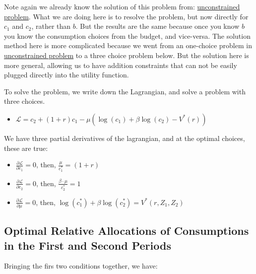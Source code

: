 \documentclass[
]{book}
\providecommand{\tightlist}{%
  \setlength{\itemsep}{0pt}\setlength{\parskip}{0pt}}
\begin{document}
Note again we already know the solution of this problem from:
\href{https://fanwangecon.github.io/Math4Econ/derivative_application/K_save_households.html}{unconstrained
problem}.
What we are doing here is to resolve the problem, but now directly for
\(c_1\) and \(c_2\), rather than \(b\). But the results are the same because
once you know \(b\) you know the consumption choices from the budget, and
vice-versa. The solution method here is more complicated because we went
from an one-choice problem in \href{https://fanwangecon.github.io/Math4Econ/derivative_application/K_save_households.html}{unconstrained
problem}
to a three choice problem below. But the solution here is more general,
allowing us to have addition constraints that can not be easily plugged
directly into the utility function.

To solve the problem, we write down the Lagrangian, and solve a problem
with three choices.

\begin{itemize}
\tightlist
\item
  \(\displaystyle \mathcal{L}=c_2 +(1+r)c_1 -\mu \left(\log (c_1 )+\beta \log (c_2 )-V^* (r)\right)\)
\end{itemize}

We have three partial derivatives of the lagrangian, and at the optimal
choices, these are true:

\begin{itemize}
\item
  \(\frac{\partial \mathcal{L}}{\partial c_1 }=0\), then,
  \(\frac{\mu }{c_1^{\ast } }=(1+r)\)
\item
  \(\frac{\partial \mathcal{L}}{\partial c_2 }=0\), then,
  \(\frac{\beta \cdot \mu }{c_2^{\ast } }=1\)
\item
  \(\frac{\partial \mathcal{L}}{\partial \mu }=0\), then,
  \(\log (c_1^{\ast } )+\beta \log (c_2^{\ast } )=V^{\ast } (r,Z_1 ,Z_2 )\)
\end{itemize}

\hypertarget{optimal-relative-allocations-of-consumptions-in-the-first-and-second-periods-1}{%
\subsection{Optimal Relative Allocations of Consumptions in the First and Second Periods}\label{optimal-relative-allocations-of-consumptions-in-the-first-and-second-periods-1}}

Bringing the firs two conditions together, we have:
\end{document}
